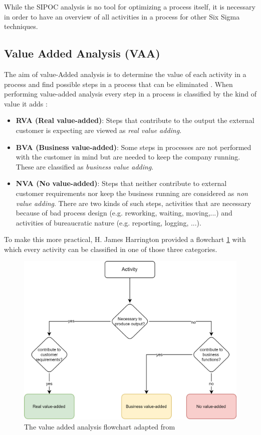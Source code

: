 While the SIPOC analysis is no tool for optimizing a process itself, it is necessary in order to have an overview of all activities in a process for other Six Sigma techniques. 

\subsection{Value Added Analysis (VAA)}

The aim of value-Added analysis is to determine the value of each activity in a process and find possible steps in a process that can be eliminated \cite{fundamentals}\cite{harrington2016value}. When performing value-added analysis every step in a process is classified by the kind of value it adds \cite{harrington2016value}: 

\begin{itemize}
	\item \textbf{RVA (Real value-added)}: Steps that contribute to the output the external customer is expecting are viewed as \textit{real value adding}. 
	\item \textbf{BVA (Business value-added)}: Some steps in processes are not performed with the customer in mind but are needed to  keep the company running. These are classified as \textit{business value adding}.
	\item \textbf{NVA (No value-added)}: Steps that neither contribute to external customer requirements nor keep the business running are considered as \textit{non value adding}. There are two kinds of such steps, activities that are necessary because of bad process design (e.g. reworking, waiting, moving,...) and activities of bureaucratic nature (e.g. reporting, logging, ...).
\end{itemize}

To make this more practical, H. James Harrington provided a flowchart \ref{fig:VAA-flow} with which every activity can be classified in one of those three categories\cite{harrington2016value}.

\begin{figure}[H]
	\centering
	\includegraphics[width=0.8\columnwidth]{graphics/VAA}
	\caption{The value added analysis flowchart adapted from \cite{harrington2016value}} 
	\label{fig:VAA-flow} 
\end{figure}

